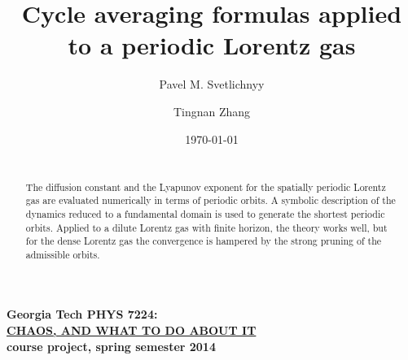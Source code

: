 \documentclass[pre,preprint,groupedaddress,showpacs,showkeys]{revtex4}
\begin{document}
				\title{
Cycle averaging formulas applied to a periodic Lorentz gas
				}\author{
Pavel M. Svetlichnyy}
                \author{
Tingnan Zhang}
				\date{\today} %

				\begin{abstract}
\noindent
{}
\\

The diffusion constant and the Lyapunov exponent
for the spatially periodic Lorentz gas are evaluated
numerically in terms of periodic orbits.
A symbolic description of the dynamics reduced to a fundamental domain is
used to generate the shortest periodic orbits.
Applied to a dilute Lorentz gas with finite horizon, the
theory works well, but for the dense Lorentz gas the convergence
is hampered by the strong pruning of the admissible orbits.
                \end{abstract}
					\maketitle

\noindent
{\bf Georgia Tech PHYS 7224:}\\
\underline{\bf CHAOS, AND WHAT TO DO ABOUT IT }\\
{\bf course project, spring semester 2014}


\ifboyscout
{}
\fi
\end{document}
